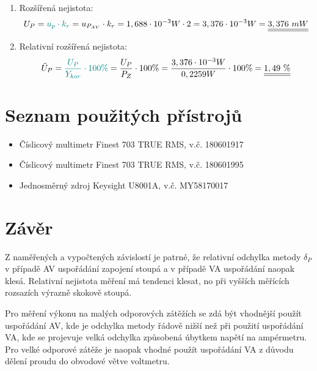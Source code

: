 \documentclass[a4paper, czech]{article}
\begin{document}
\begin{enumerate}
    \item Rozšířená nejistota:
    \begin{multline*}
        U_P = \textcolor{teal}{u_p \cdot k_r} = u_{P_{AV}} \cdot k_r = 1,688 \cdot 10^{-3} W \cdot 2 = 3,376 \cdot 10^{-3} W = \underline{\underline{3,376\ mW}} \hfill
    \end{multline*}

    \item Relativní rozšířená nejistota:
    \begin{multline*}
        \tilde{U}_P = \textcolor{teal}{\frac{U_P}{Y_{kor}} \cdot 100 \%} = \frac{U_P}{P_Z} \cdot 100 \% = \frac{3,376 \cdot 10^{-3} W}{0,2259 W} \cdot 100 \% = \underline{\underline{1,49\ \%}} \hfill
    \end{multline*}
\end{enumerate}

\section{Seznam použitých přístrojů}

\begin{itemize}
    \item Číslicový multimetr Finest 703 TRUE RMS, v.č. 180601917
    \item Číslicový multimetr Finest 703 TRUE RMS, v.č. 180601995
    \item Jednosměrný zdroj Keysight U8001A, v.č. MY58170017
\end{itemize}

\section{Závěr}

Z naměřených a vypočtených závislostí je patrné, že relativní odchylka metody $\delta_P$ v případě AV uspořádání zapojení stoupá a v případě VA uspořádání naopak klesá.
Relativní nejistota měření má tendenci klesat, no při vyšších měřících rozsazích výrazně skokově stoupá.

Pro měření výkonu na malých odporových zátěžích se zdá být vhodnější použít uspořádání AV, kde je odchylka metody řádově nižší než při použití uspořádání VA, kde se projevuje velká odchylka způsobená úbytkem napětí na ampérmetru.
Pro velké odporové zátěže je naopak vhodné použít uspořádání VA z důvodu dělení proudu do obvodové větve voltmetru.
\end{document}
